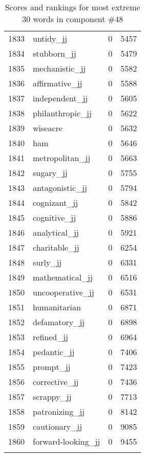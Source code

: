 \begin{longtable}[!htbp]{| rlr@{.}l |}
    1833 & untidy\_jj & 0 & 5457 \\
    1834 & stubborn\_jj & 0 & 5479 \\
    1835 & mechanistic\_jj & 0 & 5582 \\
    1836 & affirmative\_jj & 0 & 5588 \\
    1837 & independent\_jj & 0 & 5605 \\
    1838 & philanthropic\_jj & 0 & 5622 \\
    1839 & wiseacre & 0 & 5632 \\
    1840 & ham & 0 & 5646 \\
    1841 & metropolitan\_jj & 0 & 5663 \\
    1842 & sugary\_jj & 0 & 5755 \\
    1843 & antagonistic\_jj & 0 & 5794 \\
    1844 & cognizant\_jj & 0 & 5842 \\
    1845 & cognitive\_jj & 0 & 5886 \\
    1846 & analytical\_jj & 0 & 5921 \\
    1847 & charitable\_jj & 0 & 6254 \\
    1848 & surly\_jj & 0 & 6331 \\
    1849 & mathematical\_jj & 0 & 6516 \\
    1850 & uncooperative\_jj & 0 & 6531 \\
    1851 & humanitarian & 0 & 6871 \\
    1852 & defamatory\_jj & 0 & 6898 \\
    1853 & refined\_jj & 0 & 6964 \\
    1854 & pedantic\_jj & 0 & 7406 \\
    1855 & prompt\_jj & 0 & 7423 \\
    1856 & corrective\_jj & 0 & 7436 \\
    1857 & scrappy\_jj & 0 & 7713 \\
    1858 & patronizing\_jj & 0 & 8142 \\
    1859 & cautionary\_jj & 0 & 9085 \\
    1860 & forward-looking\_jj & 0 & 9455 \\
    \hline
    \caption{Scores and rankings for most extreme 30 words in component \#48} \\
\end{longtable}
